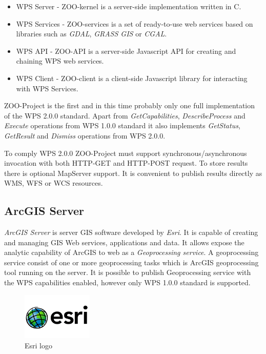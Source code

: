 \documentclass[12pt,a4paper]{article}
\begin{document}
\begin{itemize}
\item WPS Server - ZOO-kernel is a server-side implementation written in C.
\item WPS Services - ZOO-services is a set of ready-to-use web services based on libraries such as \textit{GDAL}, \textit{GRASS GIS}
or \textit{CGAL}.
\item WPS API - ZOO-API is a server-side Javascript API for creating and chaining WPS web services.
\item WPS Client - ZOO-client is a client-side Javascript library for interacting with WPS Services.
\end{itemize}

ZOO-Project is the first and in this time probably only one full implementation of the WPS 2.0.0 standard. Apart from \textit{GetCapabilities},
\textit{DescribeProcess} and \textit{Execute} operations from WPS 1.0.0 standard it also implements \textit{GetStatus}, \textit{GetResult}
and \textit{Dismiss} operations from WPS 2.0.0.

To comply WPS 2.0.0 ZOO-Project must support synchronous/asynchronous invocation with both HTTP-GET and HTTP-POST request. To store 
results there is optional MapServer support. It is convenient to publish results directly as WMS, WFS or WCS resources.

\subsection{ArcGIS Server}
\textit{ArcGIS Server} is server GIS software developed by \textit{Esri}. It is capable of creating and managing GIS Web services, applications and data. It allows expose the analytic capability of ArcGIS to web as a \textit{Geoprocessing service}. A geoprocessing
service consist of one or more geoprocessing tasks which is ArcGIS geoprocessing tool running on the server. It is possible to publish Geoprocessing service with the WPS capabilities enabled, however only WPS 1.0.0 standard is supported.

\begin{figure}[h!]
\centering
\includegraphics[width=0.3\textwidth]{img/Intro_esri.png}
\caption{Esri logo}
\label{fig:geoserver_status}
\end{figure}
\end{document}
